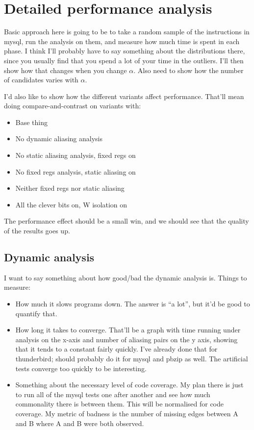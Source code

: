 
\section{Detailed performance analysis}
\label{sect:eval:time_details}

Basic approach here is going to be to take a random sample of the
instructions in mysql, run the analysis on them, and measure how much
time is spent in each phase.  I think I'll probably have to say
something about the distributions there, since you usually find that
you spend a lot of your time in the outliers.  I'll then show how that
changes when you change $\alpha$.  Also need to show how the number of
candidates varies with $\alpha$.

I'd also like to show how the different variants affect performance.
That'll mean doing compare-and-contrast on variants with:

\begin{itemize}
\item Base thing
\item No dynamic aliasing analysis
\item No static aliasing analysis, fixed regs on
\item No fixed regs analysis, static aliasing on
\item Neither fixed regs nor static aliasing
\item All the clever bits on, W isolation on
\end{itemize}

The performance effect should be a small win, and we should see that
the quality of the results goes up.

\subsection{Dynamic analysis}

I want to say something about how good/bad the dynamic analysis is.
Things to measure:

\begin{itemize}
\item How much it slows programs down.  The answer is ``a lot'', but
  it'd be good to quantify that.
\item How long it takes to converge.  That'll be a graph with time
  running under analysis on the x-axis and number of aliasing pairs on
  the y axis, showing that it tends to a constant fairly quickly.
  I've already done that for thunderbird; should probably do it for
  mysql and pbzip as well.  The artificial tests converge too quickly
  to be interesting.
\item Something about the necessary level of code coverage.  My plan
  there is just to run all of the mysql tests one after another and
  see how much commonality there is between them.  This will be
  normalised for code coverage.  My metric of badness is the number of
  missing edges between A and B where A and B were both observed.
\end{itemize}
